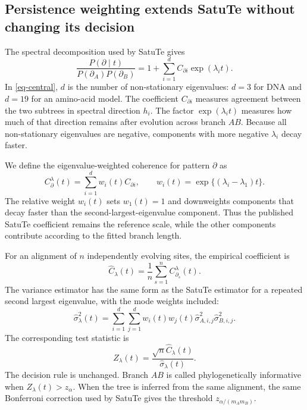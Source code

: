 \subsection*{Persistence weighting extends SatuTe without changing its decision}

The spectral decomposition used by SatuTe gives
\begin{equation}
\frac{P(\partial\mid t)}{P(\partial_A)P(\partial_B)}
=
1+\sum_{i=1}^{d} C_{\partial i}\exp(\lambda_i t).
\label{eq-central}
\end{equation}
In \cref{eq-central}, \(d\) is the number of non-stationary eigenvalues: \(d=3\) for DNA and \(d=19\) for an amino-acid model. The coefficient \(C_{\partial i}\) measures agreement between the two subtrees in spectral direction \(h_i\). The factor \(\exp(\lambda_i t)\) measures how much of that direction remains after evolution across branch \(AB\). Because all non-stationary eigenvalues are negative, components with more negative \(\lambda_i\) decay faster.

We define the eigenvalue-weighted coherence for pattern \(\partial\) as
\begin{equation}
C_{\partial}^{\lambda}(t)
=
\sum_{i=1}^{d} w_i(t)C_{\partial i},
\qquad
w_i(t)=\exp\{(\lambda_i-\lambda_1)t\}.
\label{eq-weighted-coherence}
\end{equation}
The relative weight \(w_i(t)\) sets \(w_1(t)=1\) and downweights components that decay faster than the second-largest-eigenvalue component. Thus the published SatuTe coefficient remains the reference scale, while the other components contribute according to the fitted branch length.

For an alignment of \(n\) independently evolving sites, the empirical coefficient is
\begin{equation}
\hat C_{\lambda}(t)=\frac{1}{n}\sum_{s=1}^{n}C_{\partial_s}^{\lambda}(t).
\label{eq-weighted-mean}
\end{equation}
The variance estimator has the same form as the SatuTe estimator for a repeated second largest eigenvalue, with the mode weights included:
\begin{equation}
\hat\sigma_{\lambda}^{2}(t)
=
\sum_{i=1}^{d}\sum_{j=1}^{d}
w_i(t)w_j(t)\hat\sigma_{A,i,j}^{2}\hat\sigma_{B,i,j}^{2}.
\label{eq-weighted-variance}
\end{equation}
The corresponding test statistic is
\begin{equation}
Z_{\lambda}(t)=\frac{\sqrt{n}\hat C_{\lambda}(t)}{\hat\sigma_{\lambda}(t)}.
\label{eq-weighted-z}
\end{equation}
The decision rule is unchanged. Branch \(AB\) is called phylogenetically informative when \(Z_{\lambda}(t)>z_\alpha\). When the tree is inferred from the same alignment, the same Bonferroni correction used by SatuTe gives the threshold \(z_{\alpha/(m_A m_B)}\).

